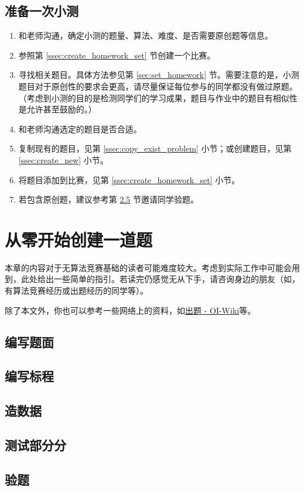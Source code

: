 \documentclass[oneside]{book}
\begin{document}
\section{准备一次小测}

\begin{enumerate}
  \item 和老师沟通，确定小测的题量、算法、难度、是否需要原创题等信息。
  \item 参照第 \ref{ssec:create_homework_set} 节创建一个比赛。
  \item 寻找相关题目。具体方法参见第 \ref{sec:set_homework} 节。需要注意的是，小测题目对于原创性的要求会更高，请尽量保证每位参与的同学都没有做过原题。（考虑到小测的目的是检测同学们的学习成果，题目与作业中的题目有相似性是允许甚至鼓励的。）
  \item 和老师沟通选定的题目是否合适。
  \item 复制现有的题目，见第 \ref{ssec:copy_exist_problem} 小节；或创建题目，见第 \ref{ssec:create_new} 小节。
  \item 将题目添加到比赛，见第 \ref{ssec:create_homework_set} 小节。
  \item 若包含原创题，建议参考第 \ref{sec:verify_problem} 节邀请同学验题。
\end{enumerate}

\chapter{从零开始创建一道题}

\label{chap:create_problem}

本章的内容对于无算法竞赛基础的读者可能难度较大。考虑到实际工作中可能会用到，此处给出一些简单的指引。若读完仍感觉无从下手，请咨询身边的朋友（如，有算法竞赛经历或出题经历的同学等）。

除了本文外，你也可以参考一些网络上的资料，如\href{https://oi-wiki.org/contest/problemsetting/}{出题 - OI-Wiki}等。


\section{编写题面}

\section{编写标程}

\section{造数据}

\label{sec:generating_data}

\section{测试部分分}

\section{验题}

\label{sec:verify_problem}
\end{document}
